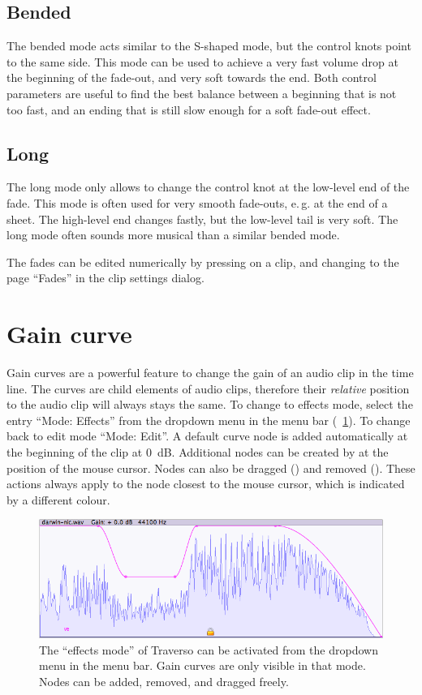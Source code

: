 \subsection{Bended}
The bended mode acts similar to the S-shaped mode, but the control knots point to the same side. This mode can be used to achieve a very fast volume drop at the beginning of the fade-out, and very soft towards the end. Both control parameters are useful to find the best balance between a beginning that is not too fast, and an ending that is still slow enough for a soft fade-out effect.

\subsection{Long}
The long mode only allows to change the control knot at the low-level end of the fade. This mode is often used for very smooth fade-outs, e.\,g. at the end of a sheet. The high-level end changes fastly, but the low-level tail is very soft. The long mode often sounds more musical than a similar bended mode.

The fades can be edited numerically by pressing  on a clip, and changing to the page ``Fades'' in the clip settings dialog.

\section{Gain curve}
Gain curves are a powerful feature to change the gain of an audio clip in the time line. The curves are child elements of audio clips, therefore their \emph{relative} position to the audio clip will always stays the same. To change to effects mode, select the entry ``Mode: Effects'' from the dropdown menu in the menu bar (\FigB~\ref{fig_gcurve01}). To change back to edit mode ``Mode: Edit''. A default curve node is added automatically at the beginning of the clip at 0~dB. Additional nodes can be created by  at the position of the mouse cursor. Nodes can also be dragged () and removed (). These actions always apply to the node closest to the mouse cursor, which is indicated by a different colour.

\begin{figure}[t]
 \centering\includegraphics[width=\textwidth]{images/gcurve01}
 \caption{The ``effects mode'' of Traverso can be activated from the dropdown menu in the menu bar. Gain curves are only visible in that mode. Nodes can be added, removed, and dragged freely.}
 \label{fig_gcurve01}
\end{figure}

